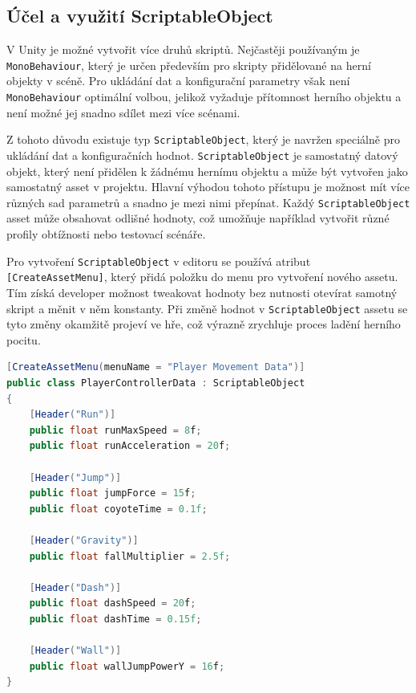 \subsection{Účel a využití ScriptableObject}

V Unity je možné vytvořit více druhů skriptů. Nejčastěji používaným je \texttt{MonoBehaviour}, který je určen především pro skripty přidělované na herní objekty v scéně. Pro ukládání dat a konfigurační parametry však není \texttt{MonoBehaviour} optimální volbou, jelikož vyžaduje přítomnost herního objektu a není možné jej snadno sdílet mezi více scénami.

Z tohoto důvodu existuje typ \texttt{ScriptableObject}, který je navržen speciálně pro ukládání dat a konfiguračních hodnot. \texttt{ScriptableObject} je samostatný datový objekt, který není přidělen k žádnému hernímu objektu a může být vytvořen jako samostatný asset v projektu. Hlavní výhodou tohoto přístupu je možnost mít více různých sad parametrů a snadno je mezi nimi přepínat. Každý \texttt{ScriptableObject} asset může obsahovat odlišné hodnoty, což umožňuje například vytvořit různé profily obtížnosti nebo testovací scénáře.

Pro vytvoření \texttt{ScriptableObject} v editoru se používá atribut \texttt{[CreateAssetMenu]}, který přidá položku do menu pro vytvoření nového assetu. Tím získá developer možnost tweakovat hodnoty bez nutnosti otevírat samotný skript a měnit v něm konstanty. Při změně hodnot v \texttt{ScriptableObject} assetu se tyto změny okamžitě projeví ve hře, což výrazně zrychluje proces ladění herního pocitu.

\begin{lstlisting}[language=csharp,caption={Listing 1: Definice třídy PlayerControllerData}]
[CreateAssetMenu(menuName = "Player Movement Data")]
public class PlayerControllerData : ScriptableObject
{
    [Header("Run")]
    public float runMaxSpeed = 8f;
    public float runAcceleration = 20f;
    
    [Header("Jump")]
    public float jumpForce = 15f;
    public float coyoteTime = 0.1f;
    
    [Header("Gravity")]
    public float fallMultiplier = 2.5f;
    
    [Header("Dash")]
    public float dashSpeed = 20f;
    public float dashTime = 0.15f;
    
    [Header("Wall")]
    public float wallJumpPowerY = 16f;
}
\end{lstlisting}
